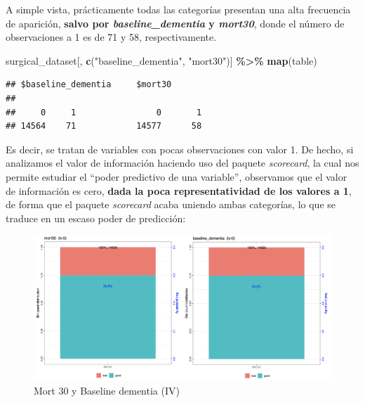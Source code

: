 \documentclass[
]{article}
\newenvironment{Shaded}{\begin{snugshade}}{\end{snugshade}}
\newcommand{\KeywordTok}[1]{\textcolor[rgb]{0.13,0.29,0.53}{\textbf{#1}}}
\newcommand{\NormalTok}[1]{#1}
\newcommand{\OperatorTok}[1]{\textcolor[rgb]{0.81,0.36,0.00}{\textbf{#1}}}
\newcommand{\StringTok}[1]{\textcolor[rgb]{0.31,0.60,0.02}{#1}}
\begin{document}
A simple vista, prácticamente todas las categorías presentan una alta
frecuencia de aparición, \textbf{salvo por \emph{baseline\_dementia} y
\emph{mort30}}, donde el número de observaciones a 1 es de 71 y 58,
respectivamente.

\begin{Shaded}
\begin{Highlighting}[]
\NormalTok{surgical\_dataset[, }\KeywordTok{c}\NormalTok{(}\StringTok{"baseline\_dementia"}\NormalTok{, }\StringTok{"mort30"}\NormalTok{)] }\OperatorTok{\%>\%}\StringTok{ }\KeywordTok{map}\NormalTok{(table)}
\end{Highlighting}
\end{Shaded}

\begin{verbatim}
## $baseline_dementia     $mort30
##
##     0     1                0       1
## 14564    71            14577      58
\end{verbatim}

Es decir, se tratan de variables con pocas observaciones con valor 1. De
hecho, si analizamos el valor de información haciendo uso del paquete
\emph{scorecard}, la cual nos permite estudiar el ``poder predictivo de
una variable'', observamos que el valor de información es cero,
\textbf{dada la poca representatividad de los valores a 1}, de forma que
el paquete \emph{scorecard} acaba uniendo ambas categorías, lo que se
traduce en un escaso poder de predicción:

\begin{figure}[h!]

{\centering \includegraphics[width=0.99\linewidth,height=0.99\textheight,]{./capturas/Depuracion/woebin_mort30_dementia} 

}

\caption{Mort 30 y Baseline dementia (IV)}\label{fig:unnamed-chunk-9}
\end{figure}
\end{document}
